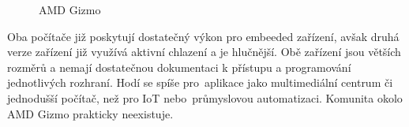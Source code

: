\begin{figure}[!ht]
    \centering
			\hspace*{5mm}
		\caption{AMD Gizmo}
\end{figure}



	
Oba počítače již poskytují dostatečný výkon pro embeeded zařízení, avšak druhá verze zařízení již využívá aktivní chlazení a je hlučnější. Obě zařízení jsou větších rozměrů a nemají dostatečnou dokumentaci k přístupu a programování jednotlivých rozhraní. Hodí se spíše pro~aplikace jako multimediální centrum či jednodušší počítač, než pro IoT nebo~průmyslovou automatizaci. Komunita okolo AMD Gizmo prakticky neexistuje.
	
	



